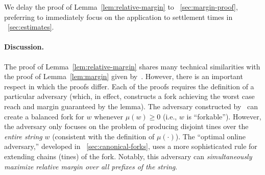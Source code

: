 We delay the proof of Lemma~\ref{lem:relative-margin} to
\Section~\ref{sec:margin-proof}, preferring to immediately focus on the
application to settlement times in \Section~\ref{sec:estimates}.

\paragraph{Discussion.} The proof of Lemma~\ref{lem:relative-margin}
shares many technical similarities with the proof of
Lemma~\ref{lem:margin} given by~\citet{KRDO17}. However, there is an
important respect in which the proofs differ. Each of the proofs
requires the definition of a particular adversary (which, in effect,
constructs a fork achieving the worst case reach and margin guaranteed
by the lemma). The adversary constructed by~\cite{KRDO17} can create a
balanced fork for $w$ whenever $\mu(w) \geq 0$ (i.e., $w$ is
``forkable''). However, the adversary only focuses on the problem of
producing disjoint tines over the \emph{entire string} $w$ (consistent
with the definition of $\mu(\cdot)$). The ``optimal online adversary,''
developed in \Section~\ref{sec:canonical-forks},
uses a more sophisticated rule for extending chains (tines) of the
fork. 
Notably, this adversary can \emph{simultaneously maximize relative margin
  over all prefixes of the string}. 

%


